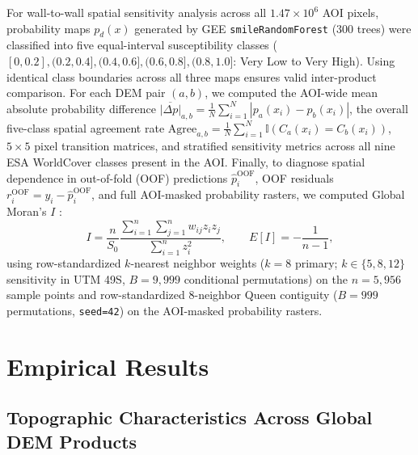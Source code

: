 \documentclass[11pt,twoside]{article}
\begin{document}
For wall-to-wall spatial sensitivity analysis across all $1.47 \times 10^6$ AOI pixels, probability maps $p_d(x)$ generated by GEE \texttt{smileRandomForest} (300 trees) were classified into five equal-interval susceptibility classes ($[0, 0.2], (0.2, 0.4], (0.4, 0.6], (0.6, 0.8], (0.8, 1.0]$: Very Low to Very High). Using identical class boundaries across all three maps ensures valid inter-product comparison. For each DEM pair $(a,b)$, we computed the AOI-wide mean absolute probability difference $\overline{|\Delta p|}_{a,b} = \frac{1}{N}\sum_{i=1}^N |p_a(x_i) - p_b(x_i)|$, the overall five-class spatial agreement rate $\text{Agree}_{a,b} = \frac{1}{N}\sum_{i=1}^N \mathbb{I}(C_a(x_i) = C_b(x_i))$, $5 \times 5$ pixel transition matrices, and stratified sensitivity metrics across all nine ESA WorldCover classes present in the AOI. Finally, to diagnose spatial dependence in out-of-fold (OOF) predictions $\hat{p}_i^{\text{OOF}}$, OOF residuals $r_i^{\text{OOF}} = y_i - \hat{p}_i^{\text{OOF}}$, and full AOI-masked probability rasters, we computed Global Moran's $I$ \cite{moran1950}:
\begin{equation}
I = \frac{n}{S_0}\frac{\sum_{i=1}^{n}\sum_{j=1}^{n} w_{ij} z_i z_j}{\sum_{i=1}^{n} z_i^2}, \qquad E[I] = -\frac{1}{n-1},
\label{eq:moran-i}
\end{equation}
using row-standardized $k$-nearest neighbor weights ($k = 8$ primary; $k \in \{5, 8, 12\}$ sensitivity in UTM 49S, $B = 9{,}999$ conditional permutations) on the $n = 5{,}956$ sample points and row-standardized 8-neighbor Queen contiguity ($B = 999$ permutations, \texttt{seed=42}) on the AOI-masked probability rasters.

\section{Empirical Results}\label{sec:results}

\subsection{Topographic Characteristics Across Global DEM Products}\label{subsec:dem-stats}
\end{document}
